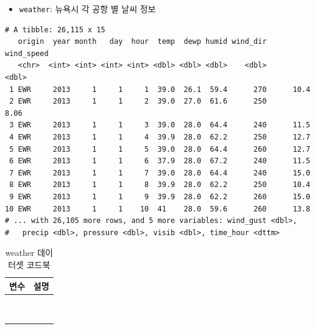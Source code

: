 \documentclass[
  11pt,
]{krantz}
\providecommand{\tightlist}{%
  \setlength{\itemsep}{0pt}\setlength{\parskip}{0pt}}
\begin{document}
\normalsize

\begin{itemize}
\tightlist
\item
  \texttt{weather}: 뉴욕시 각 공항 별 날씨 정보
\end{itemize}

\footnotesize

\begin{verbatim}
# A tibble: 26,115 x 15
   origin  year month   day  hour  temp  dewp humid wind_dir wind_speed
   <chr>  <int> <int> <int> <int> <dbl> <dbl> <dbl>    <dbl>      <dbl>
 1 EWR     2013     1     1     1  39.0  26.1  59.4      270      10.4 
 2 EWR     2013     1     1     2  39.0  27.0  61.6      250       8.06
 3 EWR     2013     1     1     3  39.0  28.0  64.4      240      11.5 
 4 EWR     2013     1     1     4  39.9  28.0  62.2      250      12.7 
 5 EWR     2013     1     1     5  39.0  28.0  64.4      260      12.7 
 6 EWR     2013     1     1     6  37.9  28.0  67.2      240      11.5 
 7 EWR     2013     1     1     7  39.0  28.0  64.4      240      15.0 
 8 EWR     2013     1     1     8  39.9  28.0  62.2      250      10.4 
 9 EWR     2013     1     1     9  39.9  28.0  62.2      260      15.0 
10 EWR     2013     1     1    10  41    28.0  59.6      260      13.8 
# ... with 26,105 more rows, and 5 more variables: wind_gust <dbl>,
#   precip <dbl>, pressure <dbl>, visib <dbl>, time_hour <dttm>
\end{verbatim}

\normalsize

\footnotesize

\begin{table}[H]

\caption{\label{tab:unnamed-chunk-53}weather 데이터셋 코드북}
\centering
\fontsize{11}{13}\selectfont
\begin{tabu} to 
\toprule
변수 & 설명\\
\midrule
{}   & \\
 & \\
   & \\
 & \\
   & \\
\addlinespace
{} & \\
   & \\
 & \\
   & \\
\bottomrule
\end{tabu}
\end{table}
\end{document}
